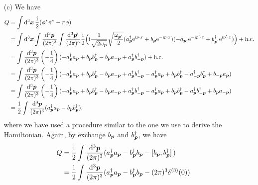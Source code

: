 \documentclass[hyperref, a4paper]{article}
\newcommand*{\ii}{\mathrm{i}}
\newcommand*{\ee}{\mathrm{e}}
\begin{document}
\begin{itemize}
    \item[(c)] We have 
    \[
        \begin{aligned}
            Q &= \int \dd[3]{\vb*{x}} \frac{\ii}{2} (\phi^* \pi^* - \pi \phi) \\
            &= \int \dd[3]{\vb*{x}} \int \frac{\dd[3]{\vb*{p}}}{(2\pi)^3}  \int \frac{\dd[3]{\vb*{p}'}}{(2\pi)^3}\frac{\ii}{2} \Big( \ii \frac{1}{\sqrt{2 \omega_{\vb*{p}}}} \sqrt{\frac{\omega_{\vb*{p}'}}{2}} (a^\dagger_{\vb*{p}} \ee^{\ii p \cdot x} + b_{\vb*{p}} \ee^{- \ii p \cdot x} ) (- a_{\vb*{p}'} \ee^{- \ii p' \cdot x} + b^\dagger_{\vb*{p}'} \ee^{\ii p' \cdot x}) \Big) + \text{h.c.} \\
            &= \int \frac{\dd[3]{\vb*{p}}}{(2\pi)^3} \left( - \frac{1}{4} \right) ( - a_{\vb*{p}}^\dagger a_{\vb*{p}} + b_{\vb*{p}} b^\dagger_{\vb*{p}} - b_{\vb*{p}} a_{- \vb*{p}} + a^\dagger_{\vb*{p}} b^\dagger_{- \vb*{p}} ) + \text{h.c.} \\
            &= \int \frac{\dd[3]{\vb*{p}}}{(2\pi)^3} \left( - \frac{1}{4} \right) ( - a_{\vb*{p}}^\dagger a_{\vb*{p}} + b_{\vb*{p}} b^\dagger_{\vb*{p}} - b_{\vb*{p}} a_{- \vb*{p}} + a^\dagger_{\vb*{p}} b^\dagger_{- \vb*{p}}  - a_{\vb*{p}}^\dagger a_{\vb*{p}} + b_{\vb*{p}} b^\dagger_{\vb*{p}} - a_{- \vb*{p}}^\dagger b^\dagger_{\vb*{p}} + b_{- \vb*{p}} a_{\vb*{p}} ) \\
            &= \int \frac{\dd[3]{\vb*{p}}}{(2\pi)^3} \left( - \frac{1}{4} \right) ( - a_{\vb*{p}}^\dagger a_{\vb*{p}} + b_{\vb*{p}} b^\dagger_{\vb*{p}} - b_{\vb*{p}} a_{- \vb*{p}} + a^\dagger_{\vb*{p}} b^\dagger_{- \vb*{p}}  - a_{\vb*{p}}^\dagger a_{\vb*{p}} + b_{\vb*{p}} b^\dagger_{\vb*{p}} - a_{\vb*{p}}^\dagger b^\dagger_{- \vb*{p}} + b_{ \vb*{p}} a_{- \vb*{p}} ) \\
            &= \frac{1}{2} \int \frac{\dd[3]{\vb*{p}}}{(2\pi)^3} (a^\dagger_{\vb*{p}} a_{\vb*{p}} - b_{\vb*{p}} b^\dagger_{\vb*{p}}),
        \end{aligned}
    \] 
    where we have used a procedure similar to the one we use to derive the Hamiltonian.
    Again, by exchange $b_{\vb*{p}}$ and $b^\dagger_{\vb*{p}}$, we have 
    \begin{equation}
        \begin{aligned}
            Q &= \frac{1}{2} \int \frac{\dd[3]{\vb*{p}}}{(2\pi)^3} (a^\dagger_{\vb*{p}} a_{\vb*{p}} - b_{\vb*{p}}^\dagger b_{\vb*{p}} - \comm*{b_{\vb*{p}}}{b^\dagger_{\vb*{p}}} ) \\
            &= \frac{1}{2} \int \frac{\dd[3]{\vb*{p}}}{(2\pi)^3} (a^\dagger_{\vb*{p}} a_{\vb*{p}} - b_{\vb*{p}}^\dagger b_{\vb*{p}} - (2\pi)^3 \delta^{(3)}(0) ) 

\end{aligned}
\end{equation}
\end{itemize}
\end{document}
